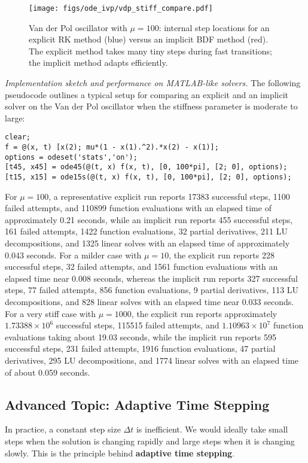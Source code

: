 \begin{figure}[h!]
    \centering
    \texttt{[image: figs/ode\_ivp/vdp\_stiff\_compare.pdf]}
    \caption{Van der Pol oscillator with $\mu=100$: internal step locations for an explicit RK method (blue) versus an implicit BDF method (red). The explicit method takes many tiny steps during fast transitions; the implicit method adapts efficiently.}
    \label{fig:vdp-stiff}
\end{figure}

\noindent\textit{Implementation sketch and performance on MATLAB-like solvers.} The following pseudocode outlines a typical setup for comparing an explicit and an implicit solver on the Van der Pol oscillator when the stiffness parameter is moderate to large:
\begin{verbatim}
clear;
f = @(x, t) [x(2); mu*(1 - x(1).^2).*x(2) - x(1)];
options = odeset('stats','on');
[t45, x45] = ode45(@(t, x) f(x, t), [0, 100*pi], [2; 0], options);
[t15, x15] = ode15s(@(t, x) f(x, t), [0, 100*pi], [2; 0], options);
\end{verbatim}
For $\mu=100$, a representative explicit run reports 17383 successful steps, 1100 failed attempts, and 110899 function evaluations with an elapsed time of approximately 0.21 seconds, while an implicit run reports 455 successful steps, 161 failed attempts, 1422 function evaluations, 32 partial derivatives, 211 LU decompositions, and 1325 linear solves with an elapsed time of approximately 0.043 seconds. For a milder case with $\mu=10$, the explicit run reports 228 successful steps, 32 failed attempts, and 1561 function evaluations with an elapsed time near 0.008 seconds, whereas the implicit run reports 327 successful steps, 77 failed attempts, 856 function evaluations, 9 partial derivatives, 113 LU decompositions, and 828 linear solves with an elapsed time near 0.033 seconds. For a very stiff case with $\mu=1000$, the explicit run reports approximately $1.73388\times 10^6$ successful steps, 115515 failed attempts, and $1.10963\times 10^7$ function evaluations taking about 19.03 seconds, while the implicit run reports 595 successful steps, 231 failed attempts, 1916 function evaluations, 47 partial derivatives, 295 LU decompositions, and 1774 linear solves with an elapsed time of about 0.059 seconds.

\subsection{Advanced Topic: Adaptive Time Stepping}
\label{subsec:ivp-adaptive-time-stepping}
In practice, a constant step size $\Delta t$ is inefficient. We would ideally take small steps when the solution is changing rapidly and large steps when it is changing slowly. This is the principle behind \textbf{adaptive time stepping}.

